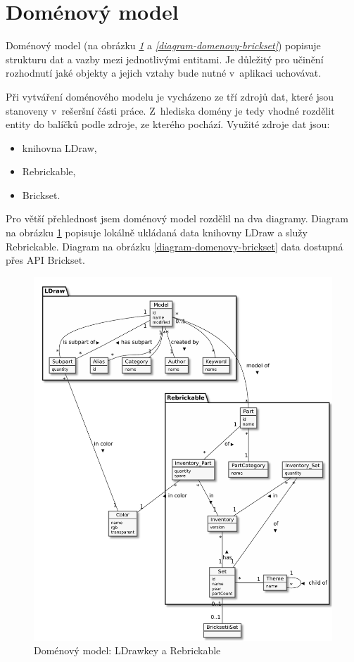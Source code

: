 \section{Doménový model}
Doménový model (na obrázku \emph{\ref{diagram-domenovy}} a \emph{\ref{diagram-domenovy-brickset}}) popisuje strukturu dat a vazby mezi jednotlivými entitami. Je důležitý pro učinění rozhodnutí jaké objekty a jejich vztahy bude nutné v~aplikaci uchovávat. 

Při vytváření doménového modelu je vycházeno ze tří zdrojů dat, které jsou stanoveny v~rešeršní části práce. Z~hlediska domény je tedy vhodné rozdělit entity do balíčků podle zdroje, ze kterého pochází. Využité zdroje dat jsou: 
\begin{itemize}
  \item knihovna LDraw,
  \item Rebrickable,
  \item Brickset.
\end{itemize}

Pro větší přehlednost jsem doménový model rozdělil na dva diagramy. Diagram na obrázku \ref{diagram-domenovy} popisuje lokálně ukládaná data knihovny LDraw a služy Rebrickable. Diagram na obrázku \ref{diagram-domenovy-brickset} data dostupná přes API Brickset. 

\begin{figure}[htbp]
    \centering
    \includegraphics[width=\textwidth,height=\textheight,keepaspectratio]{pdfs/domain_ldraw_rebrickable}
    \caption{Doménový model: LDrawkey a Rebrickable\label{diagram-domenovy}}
  \end{figure}

